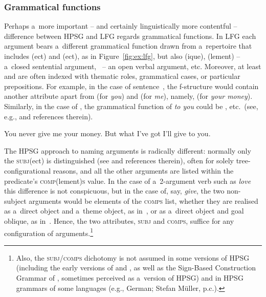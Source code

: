 \documentclass[output=paper,hidelinks]{langscibook}
\begin{document}
\subsubsection{Grammatical functions}
\label{sec:arch:gfs}

Perhaps a~more important -- and certainly linguistically more contentful -- difference between HPSG and LFG regards grammatical functions.  In LFG each argument bears a~different grammatical function drawn from a~repertoire that includes \SUBJ{}(ect) and \OBJ{}(ect), as in Figure~\ref{fig:ex:lfg}, but also \OBL{}(ique), \COMP{}(lement) -- a~closed sentential argument, \XCOMP\ -- an open verbal argument, etc.  Moreover, at least \OBJ and \OBL are often indexed with thematic roles, grammatical cases, or particular prepositions.  For example, in the case of sentence~, the f-structure would contain another attribute apart from \SUBJ (for \emph{you}) and \OBJ (for \emph{me}), namely,  (for \emph{your money}). Similarly, in the case of , the grammatical function of \emph{to you} could be , etc.\ (see, e.g., \citealt[Section {10.3}]{DLM:LFG} and references therein).

\ea\label{ex:give:theme}
You never give me your money.
\ex\label{ex:give:goal}
But what I've got I'll give to you. 
\z

The HPSG approach to naming arguments is radically different: normally only the \textsc{subj}(ect) is distinguished (see \citealt[Chapter {9}]{pollard1994head-driven} and references therein), often for solely tree\hyp{}configurational reasons, and all the other arguments are listed within the predicate's \textsc{comp}(lement)\textsc{s} value.  In the case of a~2-argument verb such as \emph{love} this difference is not conspicuous, but in the case of, say, \emph{give}, the two non-subject arguments would be elements of the \textsc{comps} list, whether they are realised as a~direct object and a~theme object, as in~, or as a~direct object and goal oblique, as in~.  Hence, the two attributes, \textsc{subj} and \textsc{comps}, suffice for any configuration of arguments.\footnote{Also, the \textsc{subj}/\textsc{comps} dichotomy is not assumed in some versions of HPSG (including the early versions of \citealt{pollardsag87} and \citealt[Chapters {1--8}]{pollard1994head-driven}, as well as the Sign-Based Construction Grammar of \citealt{sag2012sign-based}, sometimes perceived as a~version of HPSG) and in HPSG grammars of some languages (e.g., German; Stefan Müller, p.c.).}
\end{document}
